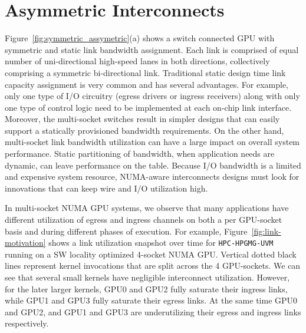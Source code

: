 \section{Asymmetric Interconnects}
\label{sec:interconnect}

Figure~\ref{fig:symmetric_assymetric}(a) shows a switch connected GPU
with symmetric and static link bandwidth assignment.
Each link is comprised of equal number of uni-directional high-speed
lanes in both directions, collectively comprising a symmetric bi-directional
link. Traditional static design time link capacity assignment is very common and has
several advantages. For example, only one type of I/O circuitry
(egress drivers or ingress receivers) along with only one type of control logic
need to be implemented at each on-chip link interface. Moreover, the multi-socket
switches result in simpler designs that can easily support a statically provisioned
bandwidth requirements. On the other hand, multi-socket link bandwidth utilization can have
a large impact on overall system performance. Static partitioning of bandwidth,
when application needs are dynamic, can leave performance on the table.
Because I/O bandwidth is a limited and expensive system resource, NUMA-aware
interconnects designs must look for innovations that can keep wire and I/O
utilization high. 

In multi-socket NUMA GPU systems, we observe that many applications have 
different utilization of egress and ingress channels on both a per GPU-socket basis
and during different phases of execution. For example,
Figure~\ref{fig:link-motivation} shows a link utilization snapshot over time for
\texttt{HPC-HPGMG-UVM} running on a SW locality optimized 4-socket NUMA GPU. 
Vertical dotted black lines represent
kernel invocations that are split across the 4 GPU-sockets. We can see that 
several small kernels have
negligible interconnect utilization. However, for the later
larger kernels, GPU0 and GPU2 fully saturate their ingress links,
while GPU1 and GPU3 fully saturate their egress links. At the same time GPU0 
and GPU2, and GPU1 and GPU3 are underutilizing their egress and ingress links respectively.


